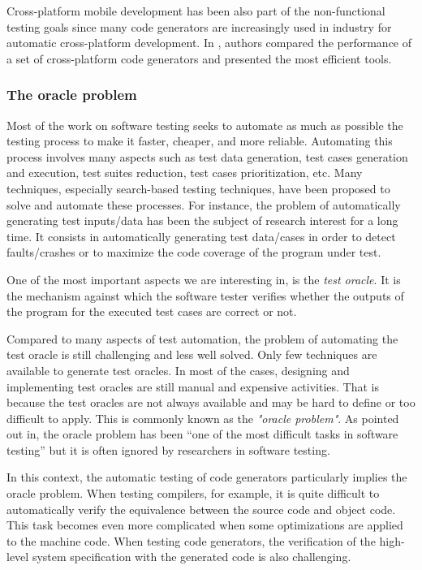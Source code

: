 Cross-platform mobile development has been also part of the non-functional testing goals since many code generators are increasingly used in industry for automatic cross-platform development. In \cite{pazirandeh2015evaluation,hartmann2011cross}, authors compared the performance of a set of cross-platform code generators and presented the most efficient tools.



\subsubsection{The oracle problem}
\label{sec:The oracle problem}

Most of the work on software testing seeks to automate as much as possible the testing process to make it faster, cheaper, and more reliable. 
Automating this process involves many aspects such as test data generation, test cases generation and execution, test suites reduction, test cases prioritization, etc. Many techniques, especially search-based testing techniques, have been proposed to solve and automate these processes\cite{ali2010systematic}.
For instance, the problem of automatically generating test inputs/data has been the subject of research interest for a long time. It consists in automatically generating test data/cases in order to detect faults/crashes or to maximize the code coverage of the program under test. 

One of the most important aspects we are interesting in, is the \textit{test oracle}. It is the mechanism against which the software tester verifies whether the outputs of the program for the executed test cases are correct or not.

Compared to many aspects of test automation, the problem of automating the test oracle is still challenging and less well solved. Only few techniques are available to generate test oracles. In most of the cases, designing and implementing test oracles are still manual and expensive activities. That is because the test oracles are not always available and may be hard to define or too difficult to apply\cite{barr2015oracle}. This is commonly known as the \textit{"oracle problem"}. 
As pointed out in\cite{manolache2001software}, the oracle problem has been “one of the most difficult tasks in software testing” but it is often ignored by researchers in software testing.

In this context, the automatic testing of code generators particularly implies the oracle problem. When testing compilers, for example, it is quite difficult to automatically verify the equivalence between the source code and object code. This task becomes even more complicated when some optimizations are applied to the machine code. 
When testing code generators, the verification of the high-level system specification with the generated code is also challenging.  

